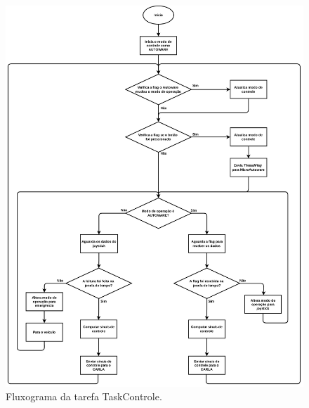 \begin{figure}[H]
	\centering
	\includegraphics[height= 0.8\textheight]{img/fluxograma_taskcontrole}
	\caption{Fluxograma da tarefa TaskControle.}
	\label{fig:fluxograma_taskcontrole}
\end{figure}


